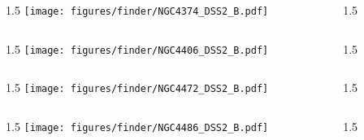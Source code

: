 \documentclass[final]{beamer}
\newlength{\colwidth}
\begin{document}

\begin{frame}[t]{}
  \begin{columns}[T]
    \begin{column}{1.5\colwidth}
      \centering
      \texttt{[image: figures/finder/NGC4374\_DSS2\_B.pdf]}
    \end{column}
    \begin{column}{1.5\colwidth}
      \Large
      
    \end{column}
  \end{columns}
  \vspace{\fill}
  \begin{columns}[T]
    \begin{column}{1.5\colwidth}
      \centering
      \texttt{[image: figures/finder/NGC4406\_DSS2\_B.pdf]}
    \end{column}
    \begin{column}{1.5\colwidth}
      \Large
      
    \end{column}
  \end{columns}
\end{frame}


\begin{frame}[t]{}
  \begin{columns}[T]
    \begin{column}{1.5\colwidth}
      \centering
      \texttt{[image: figures/finder/NGC4472\_DSS2\_B.pdf]}
    \end{column}
    \begin{column}{1.5\colwidth}
      \Large
      
    \end{column}
  \end{columns}
  \vspace{\fill}
  \begin{columns}[T]
    \begin{column}{1.5\colwidth}
      \centering
      \texttt{[image: figures/finder/NGC4486\_DSS2\_B.pdf]}
    \end{column}
    \begin{column}{1.5\colwidth}
      \Large
      
    \end{column}
  \end{columns}
\end{frame}
\end{document}
